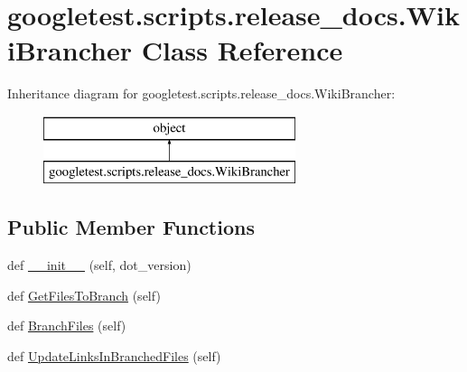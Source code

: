 \hypertarget{classgoogletest_1_1scripts_1_1release__docs_1_1_wiki_brancher}{}\section{googletest.\+scripts.\+release\+\_\+docs.\+Wiki\+Brancher Class Reference}
\label{classgoogletest_1_1scripts_1_1release__docs_1_1_wiki_brancher}
Inheritance diagram for googletest.\+scripts.\+release\+\_\+docs.\+Wiki\+Brancher\+:\begin{figure}[H]
\begin{center}
\leavevmode
\includegraphics[height=2.000000cm]{d5/d97/classgoogletest_1_1scripts_1_1release__docs_1_1_wiki_brancher}
\end{center}
\end{figure}
\subsection*{Public Member Functions}
\begin{DoxyCompactItemize}
\item 
def \mbox{\hyperlink{classgoogletest_1_1scripts_1_1release__docs_1_1_wiki_brancher_a3f0c0ee189c0f00060f63d8a8a469f23}{\+\_\+\+\_\+init\+\_\+\+\_\+}} (self, dot\+\_\+version)
\item 
def \mbox{\hyperlink{classgoogletest_1_1scripts_1_1release__docs_1_1_wiki_brancher_a1c996096ba85548167b9a91de9cb2ac5}{Get\+Files\+To\+Branch}} (self)
\item 
def \mbox{\hyperlink{classgoogletest_1_1scripts_1_1release__docs_1_1_wiki_brancher_adf66693e7dcbfa2c69d06fe54224529f}{Branch\+Files}} (self)
\item 
def \mbox{\hyperlink{classgoogletest_1_1scripts_1_1release__docs_1_1_wiki_brancher_a1d8021e53ec7e3f300ce81f574192e2c}{Update\+Links\+In\+Branched\+Files}} (self)
\end{DoxyCompactItemize}
